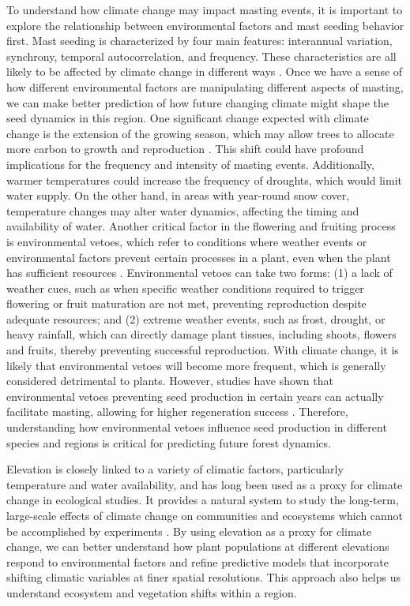 \documentclass[11pt,letter]{article}
\begin{document}
To understand how climate change may impact masting events, it is important to explore the relationship between environmental factors and mast seeding behavior first. Mast seeding is characterized by four main features: interannual variation, synchrony, temporal autocorrelation, and frequency. These characteristics are all likely to be affected by climate change in different ways \citep{hacket2021climate}. Once we have a sense of how different environmental factors are manipulating different aspects of masting, we can make better prediction of how future changing climate might shape the seed dynamics in this region. One significant change expected with climate change is the extension of the growing season, which may allow trees to allocate more carbon to growth and reproduction \citep{keenan2014net}. This shift could have profound implications for the frequency and intensity of masting events. Additionally, warmer temperatures could increase the frequency of droughts, which would limit water supply. On the other hand, in areas with year-round snow cover, temperature changes may alter water dynamics, affecting the timing and availability of water. Another critical factor in the flowering and fruiting process is environmental vetoes, which refer to conditions where weather events or environmental factors prevent certain processes in a plant, even when the plant has sufficient resources \citep{bogdziewicz2022will} . Environmental vetoes can take two forms: (1) a lack of weather cues, such as when specific weather conditions required to trigger flowering or fruit maturation are not met, preventing reproduction despite adequate resources; and (2) extreme weather events, such as frost, drought, or heavy rainfall, which can directly damage plant tissues, including shoots, flowers and fruits, thereby preventing successful reproduction. With climate change, it is likely that environmental vetoes will become more frequent, which is generally considered detrimental to plants. However, studies have shown that environmental vetoes preventing seed production in certain years can actually facilitate masting, allowing for higher regeneration success \citep{bogdziewicz2018correlated, bogdziewicz2019environmental}. Therefore, understanding how environmental vetoes influence seed production in different species and regions is critical for predicting future forest dynamics.\par
Elevation is closely linked to a variety of climatic factors, particularly temperature and water availability, and has long been used as a proxy for climate change in ecological studies. It provides a natural system to study the long-term, large-scale effects of climate change on communities and ecosystems which cannot be accomplished by experiments \citep{sundqvist2013community}. By using elevation as a proxy for climate change, we can better understand how plant populations at different elevations respond to environmental factors and refine predictive models that incorporate shifting climatic variables at finer spatial resolutions. This approach also helps us understand ecosystem and vegetation shifts within a region.\par
\end{document}
